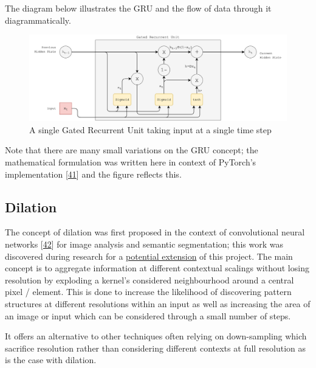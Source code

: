 \documentclass[12pt,]{article}
\begin{document}
The diagram below illustrates the GRU and the flow of data through it
diagrammatically.

\begin{figure}
\centering
\includegraphics{Images/gru.png}
\caption{A single Gated Recurrent Unit taking input at a single time
step}
\end{figure}

Note that there are many small variations on the GRU concept; the
mathematical formulation was written here in context of PyTorch's
implementation {[}\protect\hyperlink{ref-pytorchgru}{41}{]} and the
figure reflects this.

\hypertarget{dilation}{%
\subsection{Dilation}\label{dilation}}

The concept of dilation was first proposed in the context of
convolutional neural networks
{[}\protect\hyperlink{ref-yu2015multi}{42}{]} for image analysis and
semantic segmentation; this work was discovered during research for a
\protect\hyperlink{sentimentalinputfromimages}{potential extension} of
this project. The main concept is to aggregate information at different
contextual scalings without losing resolution by exploding a kernel's
considered neighbourhood around a central pixel / element. This is done
to increase the likelihood of discovering pattern structures at
different resolutions within an input as well as increasing the area of
an image or input which can be considered through a small number of
steps.

It offers an alternative to other techniques often relying on
down-sampling which sacrifice resolution rather than considering
different contexts at full resolution as is the case with dilation.
\end{document}
